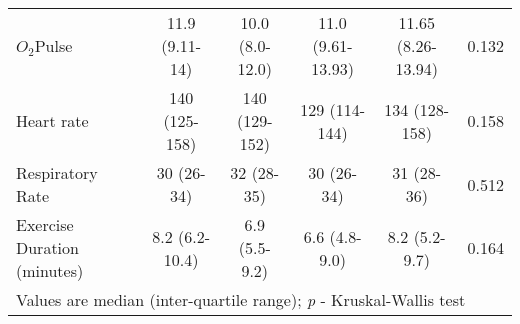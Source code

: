 \begin{sidewaystable}[p]
\begin{tabular}{|l| c c c c |c|}
		$O_2$Pulse                     & 11.9 (9.11-14)    & 10.0 (8.0-12.0)   & 11.0 (9.61-13.93) & 11.65 (8.26-13.94) & 0.132      \\
		Heart rate                     & 140 (125-158)     & 140 (129-152)     & 129 (114-144)     & 134 (128-158)      & 0.158      \\
		Respiratory Rate               & 30 (26-34)        & 32 (28-35)        & 30 (26-34)        & 31 (28-36)         & 0.512      \\
		Exercise Duration (minutes)    & 8.2 (6.2-10.4)    & 6.9 (5.5-9.2)     & 6.6 (4.8-9.0)     & 8.2 (5.2-9.7)      & 0.164      \\ \hline
		\multicolumn{6}{l}{Values are median (inter-quartile range); \textit{p} - Kruskal-Wallis test}
	\end{tabular}
\end{sidewaystable}
